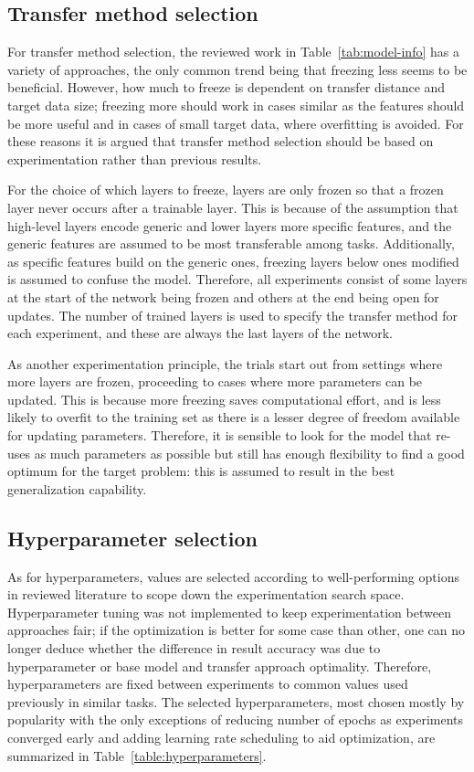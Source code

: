 \documentclass[english,twoside,openright]{UH_DS_MSc}
\begin{document}
\subsection{Transfer method selection}

For transfer method selection, the reviewed work in Table~\ref{tab:model-info} has a variety of approaches, 
the only common trend being that freezing less seems to be beneficial. 
However, how much to freeze is dependent on transfer distance and target data size;
freezing more should work in cases similar as the features should be more useful 
and in cases of small target data, where overfitting is avoided.
For these reasons it is argued that transfer method selection should be
based on experimentation rather than previous results.

For the choice of which layers to freeze, layers are only frozen so that a frozen layer never 
occurs after a trainable layer. This is because of the assumption that high-level layers 
encode generic and lower layers more specific features, and the generic features are assumed to be most transferable among tasks.
 Additionally, as specific features build on the generic ones, freezing layers 
below ones modified is assumed to confuse the model. Therefore, all experiments consist of some layers 
at the start of the network being frozen and others at the end being open for updates.
The number of trained layers is used to specify the transfer method 
for each experiment, and these are always the last layers of the network.

As another experimentation principle, the trials start out from settings where more layers are frozen, proceeding to
cases where more parameters can be updated. This is because more freezing saves 
computational effort, and is less likely to overfit to the training set as there is a lesser degree of freedom 
available for updating parameters. Therefore, it is sensible to look for the model that re-uses as 
much parameters as possible but still has enough flexibility to find a good optimum for the target problem:
this is assumed to result in the best generalization capability.

\subsection{Hyperparameter selection}

As for hyperparameters, values are selected according to well-performing 
options in reviewed literature to scope down the experimentation search space.
Hyperparameter tuning was not implemented to keep experimentation 
between approaches fair; if the optimization is better for some case than other, one can no 
longer deduce whether the difference in result accuracy was due to hyperparameter or base model and 
transfer approach optimality. Therefore, hyperparameters are fixed between experiments to common values 
used previously in similar tasks. The selected hyperparameters, most chosen mostly by popularity 
with the only exceptions of reducing number of epochs as experiments converged early
and adding learning rate scheduling to aid optimization,
are summarized in Table~\ref{table:hyperparameters}.
\end{document}
